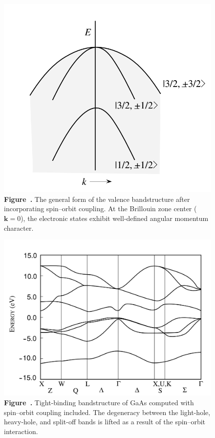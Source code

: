 \begin{figure}[h!]
	\centering
	\begin{minipage}{0.48\textwidth}
		\centering
		\includegraphics[width=\textwidth]{img/valence_bandstructure.png}
		\\[0.5em]
		\textbf{Figure~\thefigure.} The general form of the valence bandstructure after incorporating spin--orbit coupling. At the Brillouin zone center ($\mathbf{k} = 0$), the electronic states exhibit well-defined angular momentum character.
		\label{fig:valence_bandstructure}
	\end{minipage}%
	\hfill
	\begin{minipage}{0.48\textwidth}
		\centering
		\includegraphics[width=\textwidth]{img/GaAs-spinorbit.png}
		\\[0.5em]
		\textbf{Figure~\thefigure.} Tight-binding bandstructure of GaAs computed with spin--orbit coupling included. The degeneracy between the light-hole, heavy-hole, and split-off bands is lifted as a result of the spin--orbit interaction.
		\label{fig:GaAs_spin_orbit}
	\end{minipage}
\end{figure}


